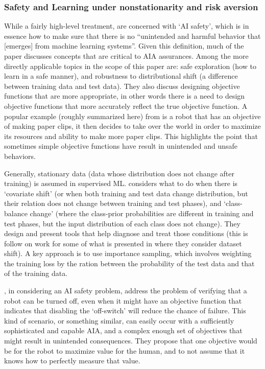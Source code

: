 \subsubsection{Safety and Learning under nonstationarity and risk aversion}
    While a fairly high-level treatment, \citet{Amodei2016-xi} are concerned with `AI safety', which is in essence how to make sure that there is no ``unintended and harmful behavior that [emerges] from machine learning systems''. Given this definition, much of the paper discusses concepts that are critical to AIA assurances. Among the more directly applicable topics in the scope of this paper are: safe exploration (how to learn in a safe manner), and robustness to distributional shift (a difference between training data and test data). They also discuss designing objective functions that are more appropriate, in other words there is a need to design objective functions that more accurately reflect the true objective function. A popular example (roughly summarized here) from \citet{Bostrom2014-fz} is a robot that has an objective of making paper clips, it then decides to take over the world in order to maximize its resources and ability to make more paper clips. This highlights the point that sometimes simple objective functions have result in unintended and unsafe behaviors.

    Generally, stationary data (data whose distribution does not change after training) is assumed in supervised ML. \citet{Sugiyama2013-ci} considers what to do when there is `covariate shift' (or when both training and test data change distribution, but their relation does not change between training and test phases), and `class-balance change' (where the class-prior probabilities are different in training and test phases, but the input distribution of each class does not change). They design and present tools that help diagnose and treat those conditions (this is follow on work for some of what is presented in \citet{Quinonero-Candela2009-fj} where they consider dataset shift). A key approach is to use importance sampling, which involves weighting the training loss by the ration between the probability of the test data and that of the training data.

    \citet{Hadfield-Menell2016-ws}, in considering an AI safety problem, address the problem of verifying that a robot can be turned off, even when it might have an objective function that indicates that disabling the `off-switch' will reduce the chance of failure. This kind of scenario, or something similar, can easily occur with a sufficiently sophisticated and capable AIA, and a complex enough set of objectives that might result in unintended consequences. They propose that one objective would be for the robot to maximize value for the human, and to not assume that it knows how to perfectly measure that value. 

